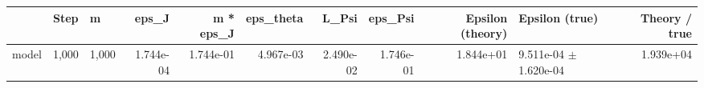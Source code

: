 \begin{tabular}{lllrrrrrrlr}
\toprule
 & Step & m & eps\_J & m * eps\_J & eps\_theta & L\_Psi & eps\_Psi & Epsilon (theory) & Epsilon (true) & Theory / true \\
\midrule
model & 1,000 & 1,000 & 1.744e-04 & 1.744e-01 & 4.967e-03 & 2.490e-02 & 1.746e-01 & 1.844e+01 & 9.511e-04 $\pm$ 1.620e-04 & 1.939e+04 \\
\bottomrule
\end{tabular}

